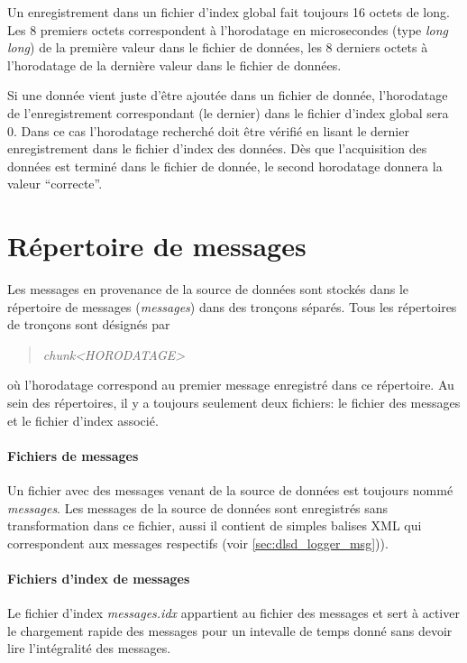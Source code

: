 \documentclass[a4paper,12pt,BCOR6mm,bibtotoc,idxtotoc]{scrbook}
\begin{document}
Un enregistrement dans un fichier d'index global fait toujours 16
octets de long. Les 8 premiers octets correspondent \`a l'horodatage
en microsecondes (type \textit{long long}) de la premi\`ere valeur
dans le fichier de donn\'ees, les 8 derniers octets \`a l'horodatage
de la derni\`ere valeur dans le fichier de donn\'ees.

Si une donn\'ee vient juste d'\^etre ajout\'ee dans un fichier de
donn\'ee, l'horodatage de l'enregistrement correspondant (le dernier)
dans le fichier d'index global sera 0.  Dans ce cas l'horodatage
recherch\'e doit \^etre v\'erifi\'e en lisant le dernier
enregistrement dans le fichier d'index des donn\'ees.  D\`es que
l'acquisition des donn\'ees est termin\'e dans le fichier de donn\'ee,
le second horodatage donnera la valeur ``correcte''.


\section{R\'epertoire de messages}
\label{sec:data_msg}

Les messages en provenance de la source de donn\'ees sont stock\'es
dans le r\'epertoire de messages (\textit{messages}) dans des tron\c
cons s\'epar\'es. Tous les r\'epertoires de tron\c cons sont
d\'esign\'es par

\begin{quote} \textit{chunk\textless HORODATAGE\textgreater} \end{quote}

o\`u l'horodatage correspond au premier message enregistr\'e dans ce
r\'epertoire. Au sein des r\'epertoires, il y a toujours seulement
deux fichiers: le fichier des messages et le fichier d'index
associ\'e.

\paragraph{Fichiers de messages}
Un fichier avec des messages venant de la source de donn\'ees est
toujours nomm\'e \textit{messages}.  Les messages de la source de
donn\'ees sont enregistr\'es sans transformation dans ce fichier,
aussi il contient de simples balises XML qui correspondent aux
messages respectifs (voir \autoref{sec:dlsd_logger_msg})).

\paragraph{Fichiers d'index de messages}
Le fichier d'index \textit{messages.idx} appartient au fichier des
messages et sert \`a activer le chargement rapide des
messages pour un intevalle de temps donn\'e sans devoir lire
l'int\'egralit\'e des messages.
\end{document}
